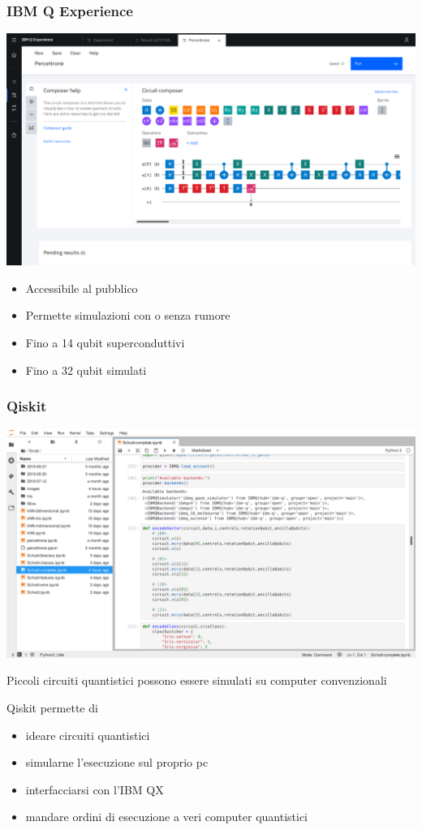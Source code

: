 \documentclass{beamer}
\begin{document}
	\begin{frame}
		\frametitle{IBM Q Experience}
	
		\begin{center}
			\includegraphics[width=.75\textwidth]{gfx/IBM_Q_Experience_percettrone}
		\end{center}
		\begin{itemize}
			\item Accessibile al pubblico
			\item Permette simulazioni con o senza rumore
			\item Fino a 14 qubit superconduttivi
			\item Fino a 32 qubit simulati
		\end{itemize}
		
	
	\end{frame}

	\begin{frame}
		\frametitle{Qiskit}
	
		\begin{center}
			\includegraphics[width=.75\textwidth]{gfx/JupyterLab}
		\end{center}

		Piccoli circuiti quantistici possono essere simulati su computer convenzionali

		Qiskit permette di 
		\begin{itemize}
			\item ideare circuiti quantistici
			\item simularne l'esecuzione sul proprio pc
			\item interfacciarsi con l'IBM QX
			\item mandare ordini di esecuzione a veri computer quantistici
		\end{itemize}
	
	\end{frame}
\end{document}
